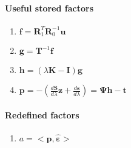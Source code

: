 \documentclass[11pt,twoside]{report}
\begin{document}
\paragraph{Useful stored factors}
\begin{enumerate}
	\item $ \mathbf{f} = \textbf{R}_1^T\textbf{R}_0^{-1}\textbf{u} $
	\item $ \mathbf{g} = \textbf{T}^{-1}\textbf{f} $
	\item $ \mathbf{h} = (\lambda\mathbf{K}-\mathbf{I})\mathbf{g} $
	\item $ \mathbf{p} = -(\frac{d\mathbold{S}}{d\lambda}\mathbold{z} + \frac{d\mathbold{s}}{d\lambda}) =  \boldsymbol{\Psi}\mathbf{h}  -\mathbf{t} $
\end{enumerate}

\paragraph{Redefined factors}
\begin{enumerate}
	\item $ a = <\mathbf{p}, \hat{\mathbold{\varepsilon}}> $
\end{enumerate}

\newpage
\end{document}
